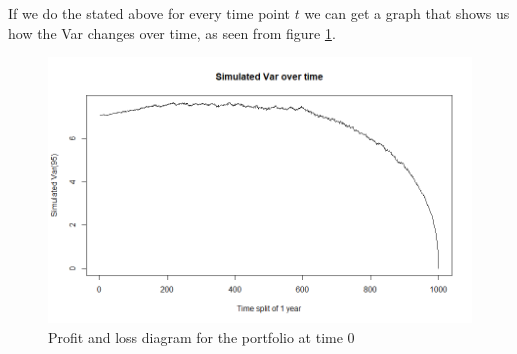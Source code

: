 \documentclass[a4paper, 12pt]{article}
\theoremstyle{definition}
\theoremstyle{plain}
\theoremstyle{definition}
\begin{document}
 \newpage 

If we do the stated above for every time point $t$ we 
can get a graph that shows us how the Var changes over time,
as seen from figure \ref{fig:var}. 

\begin{figure}[!ht]
    \centering
    \caption{Profit and loss diagram for the portfolio
            at time 0}
    \label{fig:var}
    \includegraphics[scale=0.65]{var_sim.png}
 \end{figure}
\end{document}
